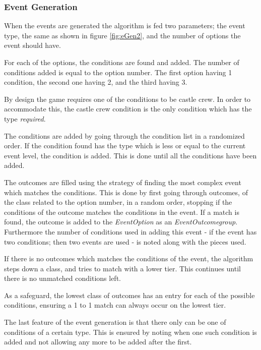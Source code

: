 \subsubsection{Event Generation}
When the events are generated the algorithm is fed two parameters;
the event type, the same as shown in figure \ref{fig:eGen2}, and the number of options the event should have.

For each of the options, the conditions are found and added. The number of conditions added is equal to the option number. The first option having 1 condition, the second one having 2, and the third having 3. 

By design the game requires one of the conditions to be castle crew. In order to accommodate this, the castle crew condition is the only condition which has the type \textit{required}.

The conditions are added by going through the condition list in a randomized order. If the condition found has the type which is less or equal to the current event level, the condition is added. This is done until all the conditions have been added.

The outcomes are filled using the strategy of finding the most complex event which matches the conditions.
This is done by first going through outcomes, of the class related to the option number, in a random order, stopping if the conditions of the outcome matches the conditions in the event. 
If a match is found, the outcome is added to the \textit{EventOption} as an \textit{EventOutcomegroup}. Furthermore the number of conditions used in adding this event - if the event has two conditions; then two events are used - is noted along with the pieces used.

If there is no outcomes which matches the conditions of the event, the algorithm steps down a class, and tries to match with a lower tier. 
This continues until there is no unmatched conditions left.

As a safeguard, the lowest class of outcomes has an entry for each of the possible conditions, ensuring a 1 to 1 match can always occur on the lowest tier. 

The last feature of the event generation is that there only can be one of conditions of a certain type. This is ensured by noting when one such condition is added and not allowing any more to be added after the first.

